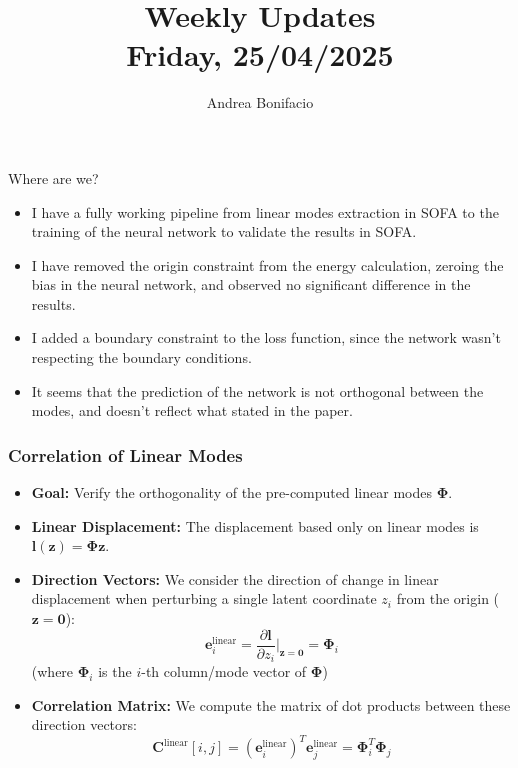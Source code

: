 \documentclass{beamer}
\title{Weekly Updates\\
\tiny{Friday, 25/04/2025}}
\author{Andrea Bonifacio}
\date{}
\begin{document}
\begin{frame}
\titlepage
\end{frame}


\begin{frame}{Where are we?}
    \begin{itemize}
        \item I have a fully working pipeline from linear modes extraction in SOFA to the training of the neural network to validate the results in SOFA.
        \item I have removed the origin constraint from the energy calculation, zeroing the bias in the neural network, and observed no significant difference in the results.
        \item I added a boundary constraint to the loss function, since the network wasn't respecting the boundary conditions.
        \item It seems that the prediction of the network is not orthogonal between the modes, and doesn't reflect what stated in the paper.
    \end{itemize}
\end{frame}

\begin{frame}
    \frametitle{Correlation of Linear Modes}
    
    \begin{itemize}
        \item \textbf{Goal:} Verify the orthogonality of the pre-computed linear modes $\mathbf{\Phi}$.
        \item \textbf{Linear Displacement:} The displacement based only on linear modes is $\mathbf{l}(\mathbf{z}) = \mathbf{\Phi} \mathbf{z}$.
        \item \textbf{Direction Vectors:} We consider the direction of change in linear displacement when perturbing a single latent coordinate $z_i$ from the origin ($\mathbf{z}=\mathbf{0}$):
        \[
            \mathbf{e}_i^{\text{linear}} = \frac{\partial \mathbf{l}}{\partial z_i} \bigg|_{\mathbf{z}=\mathbf{0}} = \mathbf{\Phi}_i 
        \]
        (where $\mathbf{\Phi}_i$ is the $i$-th column/mode vector of $\mathbf{\Phi}$)
        \item \textbf{Correlation Matrix:} We compute the matrix of dot products between these direction vectors:
        \[
            \mathbf{C}^{\text{linear}}[i, j] = (\mathbf{e}_i^{\text{linear}})^T \mathbf{e}_j^{\text{linear}} = \mathbf{\Phi}_i^T \mathbf{\Phi}_j
        \]
    \end{itemize}
    
\end{frame}
\end{document}
